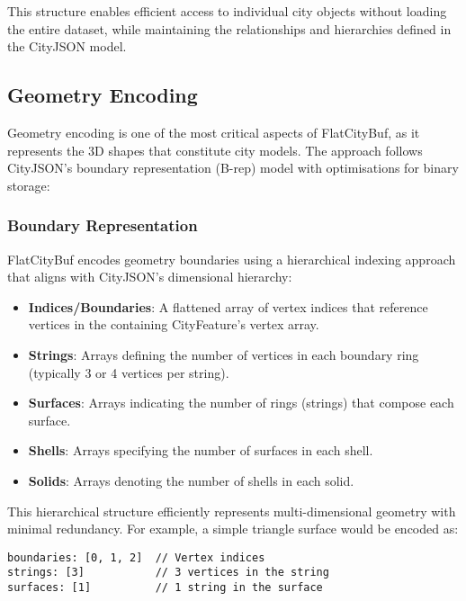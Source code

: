 This structure enables efficient access to individual city objects without loading the entire dataset, while maintaining the relationships and hierarchies defined in the CityJSON model.

\subsection{Geometry Encoding}
\label{methodology:feature_encoding:geometry_encoding}

Geometry encoding is one of the most critical aspects of FlatCityBuf, as it represents the 3D shapes that constitute city models. The approach follows CityJSON's boundary representation (B-rep) model with optimisations for binary storage:

\subsubsection{Boundary Representation}
\label{methodology:feature_encoding:geometry_encoding:boundary_representation}

FlatCityBuf encodes geometry boundaries using a hierarchical indexing approach that aligns with CityJSON's dimensional hierarchy:

\begin{itemize}
    \item \textbf{Indices/Boundaries}: A flattened array of vertex indices that reference vertices in the containing CityFeature's vertex array.
    \item \textbf{Strings}: Arrays defining the number of vertices in each boundary ring (typically 3 or 4 vertices per string).
    \item \textbf{Surfaces}: Arrays indicating the number of rings (strings) that compose each surface.
    \item \textbf{Shells}: Arrays specifying the number of surfaces in each shell.
    \item \textbf{Solids}: Arrays denoting the number of shells in each solid.
\end{itemize}

This hierarchical structure efficiently represents multi-dimensional geometry with minimal redundancy. For example, a simple triangle surface would be encoded as:

\begin{verbatim}
boundaries: [0, 1, 2]  // Vertex indices
strings: [3]           // 3 vertices in the string
surfaces: [1]          // 1 string in the surface
\end{verbatim}

